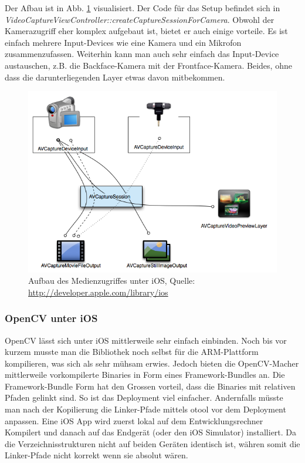\documentclass[main.tex]{subfiles}
\begin{document}
Der Afbau ist in Abb. \ref{fig:ios-capture-overview} visualisiert. Der Code für das Setup befindet sich in \textit{VideoCaptureViewController::createCaptureSessionForCamera}. Obwohl der Kamerazugriff eher komplex aufgebaut ist, bietet er auch einige vorteile. Es ist einfach mehrere Input-Devices wie eine Kamera und ein Mikrofon zusammenzufassen. Weiterhin kann man auch sehr einfach das Input-Device austauschen, z.B. die Backface-Kamera mit der Frontface-Kamera. Beides, ohne dass die darunterliegenden Layer etwas davon mitbekommen.

\begin{figure}[!ht]
\centering
\includegraphics[scale=0.6]{images/ios-capture-overview.png} 
\caption{Aufbau des Medienzugriffes unter iOS, Quelle: \url{http://developer.apple.com/library/ios}}
\label{fig:ios-capture-overview}
\end{figure}

\subsubsection{OpenCV unter iOS}
OpenCV lässt sich unter iOS mittlerweile sehr einfach einbinden. Noch bis vor kurzem musste man die Bibliothek noch selbst für die ARM-Plattform kompilieren, was sich als sehr mühsam erwies. Jedoch bieten die OpenCV-Macher mittlerweile vorkompilerte Binaries in Form eines Framework-Bundles an. Die Framework-Bundle Form hat den Grossen vorteil, dass die Binaries mit relativen Pfaden gelinkt sind. So ist das Deployment viel einfacher. Andernfalls müsste man nach der Kopilierung die Linker-Pfade mittels otool vor dem Deployment anpassen. Eine iOS App wird zuerst lokal auf dem Entwicklungsrechner Kompilert und danach auf das Endgerät (oder den iOS Simulator) installiert. Da die Verzeichnisstrukturen nicht auf beiden Geräten identisch ist, währen somit die Linker-Pfade nicht korrekt wenn sie absolut wären.
\end{document}
